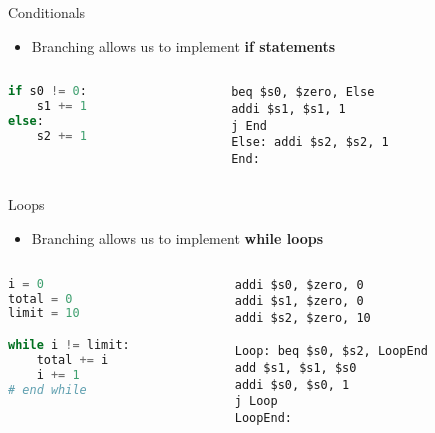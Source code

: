 \begin{frame}[fragile]{Conditionals}
	\begin{itemize}
		\pause\item Branching allows us to implement \textbf{if statements}
	\end{itemize}
	\pause
	\begin{columns}
		\begin{column}{0.43\textwidth}
			\begin{lstlisting}[language=Python,showlines=true]
if s0 != 0:
    s1 += 1
else:
    s2 += 1

			\end{lstlisting}
		\end{column}
		\pause
		\begin{column}{0.53\textwidth}
			\begin{lstlisting}
beq $s0, $zero, Else
addi $s1, $s1, 1
j End
Else: addi $s2, $s2, 1
End:
			\end{lstlisting}
		\end{column}
	\end{columns}
\end{frame}

\begin{frame}[fragile]{Loops}
	\begin{itemize}
		\pause\item Branching allows us to implement \textbf{while loops}
	\end{itemize}
	\pause
	\begin{columns}
		\begin{column}{0.43\textwidth}
			\begin{lstlisting}[language=Python,showlines=true]
i = 0
total = 0
limit = 10

while i != limit:
    total += i
    i += 1
# end while

			\end{lstlisting}
		\end{column}
		\pause
		\begin{column}{0.53\textwidth}
			\begin{lstlisting}
addi $s0, $zero, 0
addi $s1, $zero, 0
addi $s2, $zero, 10

Loop: beq $s0, $s2, LoopEnd
add $s1, $s1, $s0
addi $s0, $s0, 1
j Loop
LoopEnd:
			\end{lstlisting}
		\end{column}
	\end{columns}
\end{frame}

